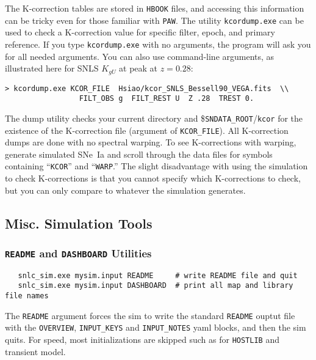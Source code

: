 \documentclass[12pt]{article}
\newcommand{\sndataroot}{{\tt SNDATA\_ROOT}}
\begin{document}
{The K-correction tables are stored in {\tt HBOOK} files,
and accessing this information can be tricky even for those
familiar with {\tt PAW}. The utility {\tt kcordump.exe} can
be used to check a K-correction value for specific filter,
epoch, and primary reference. If you type {\tt kcordump.exe}
with no arguments, the program will ask you for all needed
arguments. You can also use command-line arguments,
as illustrated here for SNLS $K_{gU}$ at peak at $z=0.28$:
%
\begin{Verbatim}[frame=single]
  > kcordump.exe KCOR_FILE  Hsiao/kcor_SNLS_Bessell90_VEGA.fits  \\
                 FILT_OBS g  FILT_REST U  Z .28  TREST 0.
\end{Verbatim}
%
The dump utility checks your current directory and
\$\sndataroot/{\tt kcor} for the existence 
of the K-correction file (argument of {\tt KCOR\_FILE}).
All K-correction dumps are done with no spectral warping.
To see K-corrections with warping, generate simulated
SNe~Ia and scroll through the data files for symbols
containing ``{\tt KCOR}'' and ``{\tt WARP}.''
The slight disadvantage with using the simulation to
check K-corrections is that you cannot specify 
which K-corrections to check, but you can only compare
to whatever the simulation generates.



  \clearpage
  \subsection{Misc. Simulation Tools}
  \label{subsec:MiscTools_sim}

  \subsubsection{{\tt README} and {\tt DASHBOARD} Utilities}
  \label{sss:sim_dashboard}

\begin{verbatim}
   snlc_sim.exe mysim.input README     # write README file and quit
   snlc_sim.exe mysim.input DASHBOARD  # print all map and library file names
\end{verbatim}
%
The {\tt README} argument forces the sim to write the standard 
{\tt README} ouptut file with the
{\tt OVERVIEW}, {\tt INPUT\_KEYS} and {\tt INPUT\_NOTES} yaml blocks,
and then the sim quits. For speed, most initializations are skipped such
as for {\tt HOSTLIB} and transient model.

}
\end{document}
